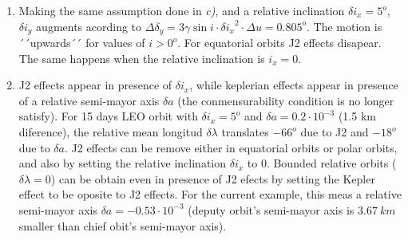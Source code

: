 \documentclass[a4paper]{article}
\begin{document}
\begin{enumerate}[label=\emph{\alph*)}]
  \item %
    Making the same assumption done in \textit{c)}, and a relative inclination $\delta i_x=5^o$, $\delta i_y$ augments acording to $\Delta \delta_y = 3\gamma\sin{i\cdot\delta i_x}^2\cdot\Delta u = 0.805^o $. The motion is ´´upwards´´ for values of $i > 0^o$. For equatorial orbits J2 effects disapear. The same happens when the relative inclination is $i_x = 0$.
   
  \item %
    J2 effects appear in presence of $\delta i_x$, while keplerian effects appear in presence of a relative semi-mayor axis $\delta a$ (the conmensurability condition is no longer satisfy). For 15 days LEO orbit with $\delta i_x = 5^o$ and $\delta a = 0.2\cdot10^{-3}$ (1.5 km diference), the relative mean longitud $\delta\lambda$ translates $-66^o$ due to J2 and $-18^o$ due to $\delta a$. J2 effects can be remove either in equatorial orbits or polar orbits, and also by setting the relative inclination $\delta i_x$ to $0$. Bounded relative orbits ($\delta \lambda = 0$) can be obtain even in presence of J2 efects by setting the Kepler effect to be oposite to J2 effects. For the current example, this meas a relative semi-mayor axis $\delta a = -0.53\cdot10^{-3}$ (deputy orbit's semi-mayor axis is $3.67~km$ smaller than chief obit's semi-mayor axis). 


\end{enumerate}
\end{document}

